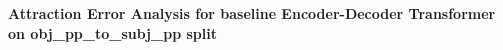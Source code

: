 \documentclass[11pt]{article}
\begin{document}
\textbf{Attraction Error Analysis for \citep{Wu2023} baseline Encoder-Decoder Transformer on obj\_pp\_to\_subj\_pp split}



\end{document}
